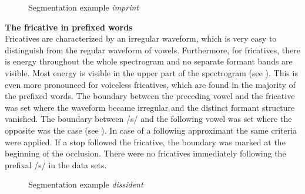 \begin{figure}[h!]
	
	\caption{Segmentation example \textit{imprint}}
	\label{fig:segmentation imprint}
\end{figure}


\textbf{The fricative in prefixed words}\\




Fricatives are characterized by an irregular waveform, which is very easy to distinguish from the regular waveform of vowels. Furthermore, for fricatives, there is energy throughout the whole spectrogram and no separate formant bands are visible. Most energy is visible in the upper part of the spectrogram (see ). This is even more pronounced for voiceless fricatives, which are found in the majority of the prefixed words.
The boundary between the preceding vowel and the fricative was set where the waveform became irregular and the distinct formant structure vanished. The boundary between /s/ and the following vowel was set where the opposite was the case (see ). In case of a following approximant the same criteria were applied. If a stop followed the fricative, the boundary was marked at the beginning of the occlusion. There were no fricatives immediately following the prefixal /s/ in the data sets.\\

\begin{figure} [H]
	
	\caption{Segmentation example \textit{dissident}}
	\label{fig:segmentation dissident}
\end{figure}



